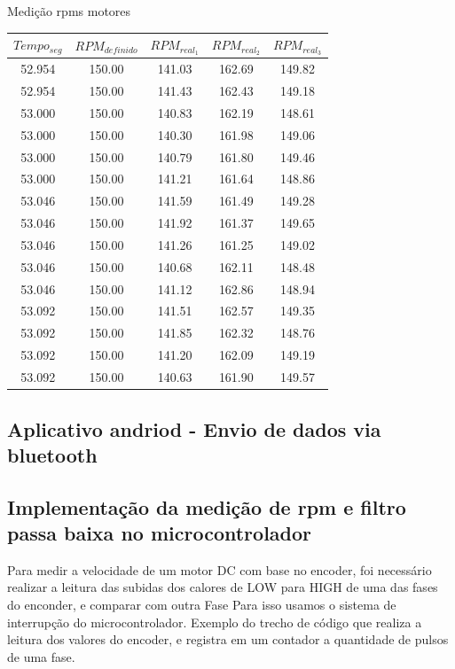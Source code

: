 \begin{quadro}[htb]
	\caption{\label{medicao_motores}Medição rpms motores}
	 \begin{tabular}{|c|c|c|c|c|}
		\hline
		\textbf{$Tempo_{seg}$} & \textbf{$RPM_{definido}$} & \textbf{$RPM_{real_{1}}$} & \textbf{$RPM_{real_{2}}$} & \textbf{$RPM_{real_{3}}$} \\ \hline
		52.954 & 150.00  & 141.03 & 162.69 & 149.82 \\ \hline
		52.954 & 150.00  & 141.43 & 162.43 & 149.18 \\ \hline
		53.000 & 150.00  & 140.83 & 162.19 & 148.61 \\ \hline
		53.000 & 150.00  & 140.30 & 161.98 & 149.06 \\ \hline
		53.000 & 150.00  & 140.79 & 161.80 & 149.46 \\ \hline
		53.000 & 150.00  & 141.21 & 161.64 & 148.86 \\ \hline
		53.046 & 150.00  & 141.59 & 161.49 & 149.28 \\ \hline
		53.046 & 150.00  & 141.92 & 161.37 & 149.65 \\ \hline
		53.046 & 150.00  & 141.26 & 161.25 & 149.02 \\ \hline
		53.046 & 150.00  & 140.68 & 162.11 & 148.48 \\ \hline
		53.046 & 150.00  & 141.12 & 162.86 & 148.94 \\ \hline
		53.092 & 150.00  & 141.51 & 162.57 & 149.35 \\ \hline
		53.092 & 150.00  & 141.85 & 162.32 & 148.76 \\ \hline
		53.092 & 150.00  & 141.20 & 162.09 & 149.19 \\ \hline
		53.092 & 150.00  & 140.63 & 161.90 & 149.57 \\ \hline
	\end{tabular}
\end{quadro}


\subsection{Aplicativo andriod - Envio de dados via bluetooth}


\subsection{Implementação da medição de rpm e filtro passa baixa no microcontrolador}

Para medir a velocidade de um motor DC com base no encoder, foi necessário realizar a leitura das subidas dos calores de LOW para HIGH de uma das fases do enconder, e comparar com outra Fase
Para isso usamos o sistema de interrupção do microcontrolador.
Exemplo do trecho de código que realiza a leitura dos valores do encoder, e registra em um contador a quantidade de pulsos de uma fase.


